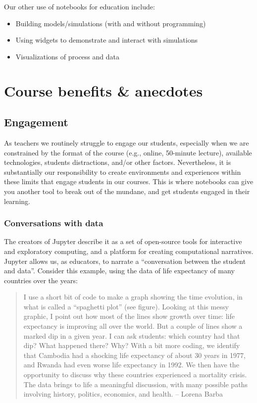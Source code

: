 \documentclass[]{book}
\providecommand{\tightlist}{%
  \setlength{\itemsep}{0pt}\setlength{\parskip}{0pt}}
\begin{document}
Our other use of notebooks for education include:

\begin{itemize}
\tightlist
\item
  Building models/simulations (with and without programming)
\item
  Using widgets to demonstrate and interact with simulations
\item
  Visualizations of process and data
\end{itemize}

\section{Course benefits \& anecdotes}\label{course-benefits-anecdotes}

\subsection{Engagement}\label{engagement}

As teachers we routinely struggle to engage our students, especially
when we are constrained by the format of the course (e.g., online,
50-minute lecture), available technologies, students distractions,
and/or other factors. Nevertheless, it is substantially our
responsibility to create environments and experiences within these
limits that engage students in our courses. This is where notebooks can
give you another tool to break out of the mundane, and get students
engaged in their learning.

\subsubsection{Conversations with data}\label{conversations-with-data}

The creators of Jupyter describe it as a set of open-source tools for
interactive and exploratory computing, and a platform for creating
computational narratives. Jupyter allows us, as educators, to narrate a
``conversation between the student and data''. Consider this example,
using the data of life expectancy of many countries over the years:

\begin{quote}
I use a short bit of code to make a graph showing the time evolution, in
what is called a ``spaghetti plot'' (see figure). Looking at this messy
graphic, I point out how most of the lines show growth over time: life
expectancy is improving all over the world. But a couple of lines show a
marked dip in a given year. I can ask students: which country had that
dip? What happened there? Why? With a bit more coding, we identify that
Cambodia had a shocking life expectancy of about 30 years in 1977, and
Rwanda had even worse life expectancy in 1992. We then have the
opportunity to discuss why these countries experienced a mortality
crisis. The data brings to life a meaningful discussion, with many
possible paths involving history, politics, economics, and health. --
Lorena Barba
\end{quote}
\end{document}
